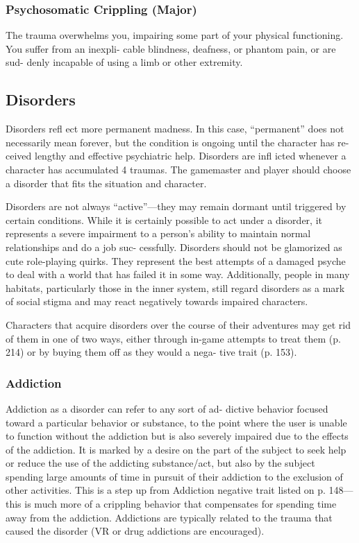 \subsubsection{Psychosomatic Crippling (Major)}

The trauma overwhelms you, impairing some part of 
your physical functioning. You suffer from an inexpli-
cable blindness, deafness, or phantom pain, or are sud-
denly incapable of using a limb or other extremity.

\subsection{Disorders}

Disorders refl ect more permanent madness. In this 
case, ``permanent'' does not necessarily mean forever, 
but the condition is ongoing until the character has re-
ceived lengthy and effective psychiatric help. Disorders 
are infl icted whenever a character has accumulated 4 
traumas. The gamemaster and player should choose a 
disorder that fits the situation and character.

Disorders are not always ``active''—they may 
remain dormant until triggered by certain conditions. 
While it is certainly possible to act under a disorder, 
it represents a severe impairment to a person's ability 
to maintain normal relationships and do a job suc-
cessfully. Disorders should not be glamorized as cute 
role-playing quirks. They represent the best attempts 
of a damaged psyche to deal with a world that has 
failed it in some way. Additionally, people in many 
habitats, particularly those in the inner system, still 
regard disorders as a mark of social stigma and may 
react negatively towards impaired characters.

Characters that acquire disorders over the course 
of their adventures may get rid of them in one of two 
ways, either through in-game attempts to treat them 
(p. 214) or by buying them off as they would a nega-
tive trait (p. 153).

\subsubsection{Addiction}

Addiction as a disorder can refer to any sort of ad-
dictive behavior focused toward a particular behavior 
or substance, to the point where the user is unable 
to function without the addiction but is also severely 
impaired due to the effects of the addiction. It is 
marked by a desire on the part of the subject to seek 
help or reduce the use of the addicting substance/act, 
but also by the subject spending large amounts of time 
in pursuit of their addiction to the exclusion of other 
activities. This is a step up from Addiction negative 
trait listed on p. 148—this is much more of a crippling 
behavior that compensates for spending time away 
from the addiction. Addictions are typically related 
to the trauma that caused the disorder (VR or drug 
addictions are encouraged).

